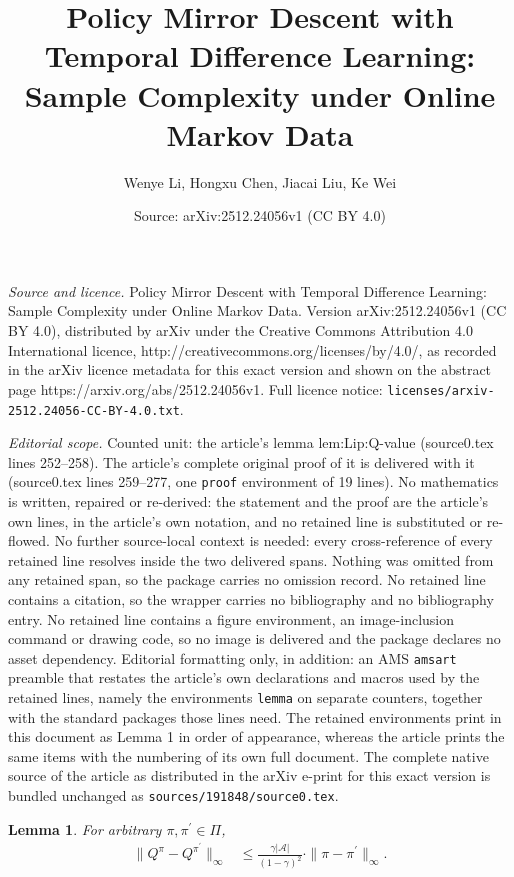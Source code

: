 \documentclass[10pt,a4paper]{amsart}
\title{Policy Mirror Descent with Temporal Difference Learning: Sample Complexity under Online Markov Data}
\author{Wenye Li, Hongxu Chen, Jiacai Liu, Ke Wei}
\date{Source: arXiv:2512.24056v1 (CC BY 4.0)}
\newtheorem{lemma}{Lemma}
\newcommand{\calA}{\mathcal{A}}
\begin{document}
\maketitle

\noindent\emph{Source and licence.} Policy Mirror Descent with Temporal Difference Learning: Sample Complexity under Online Markov Data. Version arXiv:2512.24056v1 (CC BY 4.0), distributed by arXiv under the Creative Commons Attribution 4.0 International licence, http://creativecommons.org/licenses/by/4.0/, as recorded in the arXiv licence metadata for this exact version and shown on the abstract page https://arxiv.org/abs/2512.24056v1. Full licence notice: \texttt{licenses/arxiv-2512.24056-CC-BY-4.0.txt}.\par\smallskip

\noindent\textit{Editorial scope.} Counted unit: the article's lemma lem:Lip:Q-value (source0.tex lines 252--258). The article's complete original proof of it is delivered with it (source0.tex lines 259--277, one \texttt{proof} environment of 19 lines). No mathematics is written, repaired or re-derived: the statement and the proof are the article's own lines, in the article's own notation, and no retained line is substituted or re-flowed.  No further source-local context is needed: every cross-reference of every retained line resolves inside the two delivered spans.  Nothing was omitted from any retained span, so the package carries no omission record.  No retained line contains a citation, so the wrapper carries no bibliography and no bibliography entry.  No retained line contains a figure environment, an image-inclusion command or drawing code, so no image is delivered and the package declares no asset dependency.  Editorial formatting only, in addition: an AMS \texttt{amsart} preamble that restates the article's own declarations and macros used by the retained lines, namely the environments \texttt{lemma} on separate counters, together with the standard packages those lines need.  The retained environments print in this document as Lemma 1 in order of appearance, whereas the article prints the same items with the numbering of its own full document.  The complete native source of the article as distributed in the arXiv e-print for this exact version is bundled unchanged as \texttt{sources/191848/source0.tex}.
\begin{lemma}
    For arbitrary $\pi, \pi^\prime \in \Pi$,
    \begin{align*}
        \| Q^{\pi} - Q^{\pi^\prime} \|_\infty &\leq \frac{\gamma |\calA|}{(1-\gamma)^2} \cdot \| \pi - \pi^\prime \|_\infty.
    \end{align*}
    \label{lem:Lip:Q-value}
\end{lemma}
\end{document}
